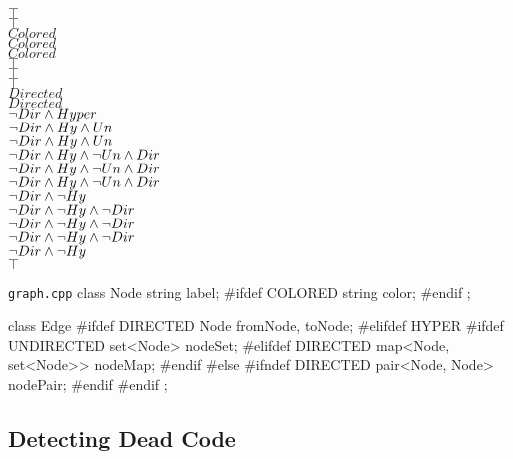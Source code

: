 \begin{frame}[fragile]{\myframetitle}
\begin{mycolumns}[t,columns=3,widths={40,23,37},animation=none]
{\begin{flushright}
				{\color{black}$\top$}\\
				$\top$\\
				$Colored$\\
				$Colored$\\
				$Colored$\\
				$\top$\\
				$\top$\\
				$\top$\\
				$Directed$\\
				$Directed$\\
				$\neg Dir \wedge Hyper$\\
				$\neg Dir \wedge Hy \wedge Un$\\
				$\neg Dir \wedge Hy \wedge Un$\\
				$\neg Dir \wedge Hy \wedge \neg Un \wedge Dir$\\
				$\neg Dir \wedge Hy \wedge \neg Un \wedge Dir$\\
				$\neg Dir \wedge Hy \wedge \neg Un \wedge Dir$\\
				$\neg Dir \wedge \neg Hy$\\
				$\neg Dir \wedge \neg Hy \wedge \neg Dir$\\
				$\neg Dir \wedge \neg Hy \wedge \neg Dir$\\
				$\neg Dir \wedge \neg Hy \wedge \neg Dir$\\
				$\neg Dir \wedge \neg Hy$\\
				$\top$
			\end{flushright}
		}
	\mynextcolumn
		\begin{cpptight}[basicstyle=\small]{\texttt{graph.cpp}}
class Node {
	string label;
#ifdef COLORED
	string color;
#endif
};

class Edge {
#ifdef DIRECTED
	Node fromNode, toNode;
#elifdef HYPER
#ifdef UNDIRECTED
	set<Node> nodeSet;
#elifdef DIRECTED
	map<Node, set<Node>> nodeMap;
#endif
#else
#ifndef DIRECTED
	pair<Node, Node> nodePair;
#endif
#endif
};
		\end{cpptight}
	\end{mycolumns}
\end{frame}

\subsection{Detecting Dead Code}

